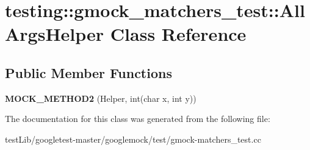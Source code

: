 \hypertarget{classtesting_1_1gmock__matchers__test_1_1AllArgsHelper}{}\section{testing\+:\+:gmock\+\_\+matchers\+\_\+test\+:\+:All\+Args\+Helper Class Reference}
\label{classtesting_1_1gmock__matchers__test_1_1AllArgsHelper}
\subsection*{Public Member Functions}
\begin{DoxyCompactItemize}
\item 
\mbox{\label{classtesting_1_1gmock__matchers__test_1_1AllArgsHelper_a571b9c1e5ab4e891085060e73c94be32}} 
{\bfseries M\+O\+C\+K\+\_\+\+M\+E\+T\+H\+O\+D2} (Helper, int(char x, int y))
\end{DoxyCompactItemize}


The documentation for this class was generated from the following file\+:\begin{DoxyCompactItemize}
\item 
test\+Lib/googletest-\/master/googlemock/test/gmock-\/matchers\+\_\+test.\+cc\end{DoxyCompactItemize}
